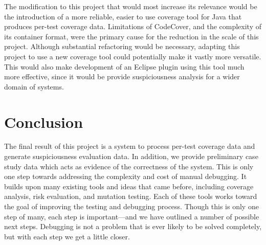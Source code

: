 The modification to this project that would most increase its relevance would be the introduction
of a more reliable, easier to use coverage tool for Java that produces per-test coverage data.
Limitations of CodeCover, and the complexity of its container format, were the primary cause
for the reduction in the scale of this project.  Although substantial refactoring would be
necessary, adapting this project to use a new coverage tool could potentially make it vastly 
more versatile.  This would also make development of an Eclipse plugin using this tool much
more effective, since it would be provide suspiciousness analysis for a wider domain of systems.

\section{Conclusion}\label{sec:end}

The final result of this project is a system to process per-test coverage data and generate
suspiciousness evaluation data.  In addition, we provide preliminary case study data which
acts as evidence of the correctness of the system.  This is only one step towards 
addressing the complexity and cost of manual debugging.  It builds upon many existing tools
and ideas that came before, including coverage analysis, risk evaluation, and mutation testing.
Each of these tools works toward the goal of improving the testing and debugging process.
Though this is only one step of many, each step is important---and we have outlined a number
of possible next steps.  Debugging is not a problem that is ever 
likely to be solved completely, but with each step we get a little closer.  